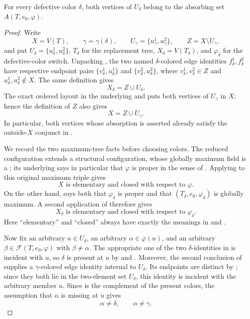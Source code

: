 \begin{lemma}
For every defective color $\delta$, both vertices of $U_\delta$ belong to
the absorbing set $A(T,e_0,\varphi)$.
\end{lemma}
\begin{proof}
Write
\[
 X=V(T),\qquad \gamma=\gamma(\delta),\qquad
 U_\gamma=\{u^1_\gamma,u^2_\gamma\},\qquad
 Z=X\setminus U_\gamma,
\]
and put $U_\delta=\{u^1_\delta,u^2_\delta\}$,
$T_\delta$ for the replacement tree, $X_\delta=V(T_\delta)$, and
$\varphi_\delta$ for the defective-color switch.  Unpacking
, the two named $\delta$-colored edge
identities $f^1_\delta,f^2_\delta$ have respective endpoint pairs
$\{v^1_\delta,u^1_\delta\}$ and
$\{v^2_\delta,u^2_\delta\}$, where $v^1_\delta,v^2_\delta\in Z$ and
$u^1_\delta,u^2_\delta\notin X$.  The same definition gives
\[
 X_\delta=Z\cup U_\delta.                                  \tag{1}
\]
The exact ordered layout in the underlying
 and
 puts both vertices of
$U_\gamma$ in $X$; hence the definition of $Z$ also gives
\[
 X=Z\cup U_\gamma.                                         \tag{2}
\]
In particular, both vertices whose absorption is asserted already satisfy
the outside-$X$ conjunct in .

We record the two maximum-tree facts before choosing colors.  The reduced
configuration extends a structural configuration, whose globally maximum
field is a ; its underlying
 says in particular that $\varphi$ is proper in the sense
of .  Applying
 to this original maximum triple gives
\[
 X\text{ is elementary and closed with respect to }\varphi. \tag{3}
\]
On the other hand,  says both that
$\varphi_\delta$ is proper and that $(T_\delta,e_0,\varphi_\delta)$ is
globally maximum.  A second application of
 therefore gives
\[
 X_\delta\text{ is elementary and closed with respect to }
 \varphi_\delta.                                            \tag{4}
\]
Here ``elementary'' and ``closed'' always have exactly the meanings in
 and
.

Now fix an arbitrary $u\in U_\delta$, an arbitrary
$\alpha\in\overline\varphi(u)$, and an arbitrary
$\beta\in\mathcal F(T,e_0,\varphi)$ with $\beta\ne\alpha$.  The appropriate
one of the two $\delta$-identities in
 is incident with $u$, so $\delta$ is
present at $u$ by  and .
Moreover, the second conclusion of
 supplies a
$\gamma$-colored edge identity internal to $U_\delta$.  Its endpoints are
distinct by ; since they both lie in the
two-element set $U_\delta$, this identity is incident with the arbitrary
member $u$.  Since  is the complement of the
present colors, the assumption that $\alpha$ is missing at $u$ gives
\[
 \alpha\ne\delta,\qquad \alpha\ne\gamma.                   \tag{5}
\]


\end{proof}
